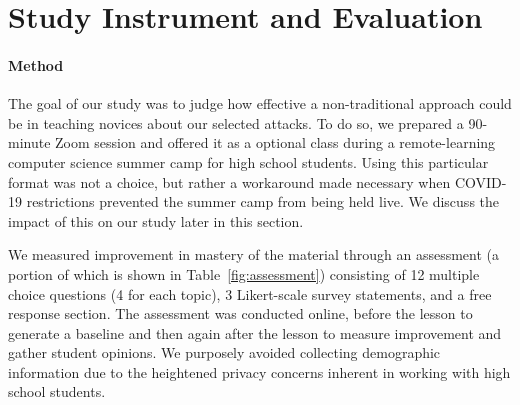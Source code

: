 \section{Study Instrument and Evaluation}
\label{SEC:evaluation}

\paragraph{Method}The goal of our study was to judge how effective a non-traditional approach
could be in teaching novices about our selected attacks. To do so, we prepared a 90-minute Zoom session and offered it as a optional class during
a remote-learning computer science summer camp for high school
students. Using this particular format was not a choice, but rather a workaround made necessary when COVID-19 restrictions prevented the summer camp from being held live. We discuss the impact of this on our study later in this section.


We measured improvement in mastery
of the material
through
an  assessment (a portion of which is shown in Table~\ref{fig:assessment})
consisting of
12 multiple choice questions (4 for each topic),
3 Likert-scale survey statements,
and a free response section.
The assessment was conducted
online, before the lesson to
generate a baseline and then again after the lesson to measure improvement
and gather student opinions.  We purposely avoided collecting demographic information
due to the heightened privacy concerns inherent in working with high school students.








